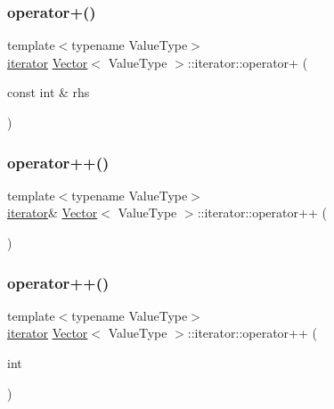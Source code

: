 \mbox{\label{classVector_1_1iterator_a92a558bb60ce7d4100520587da3043a7}} 
\subsubsection{\texorpdfstring{operator+()}{operator+()}}
{\footnotesize\ttfamily template$<$typename Value\+Type$>$ \\
\mbox{\hyperlink{classVector_1_1iterator}{iterator}} \mbox{\hyperlink{classVector}{Vector}}$<$ Value\+Type $>$\+::iterator\+::operator+ (\begin{DoxyParamCaption}\item[{const int \&}]{rhs }\end{DoxyParamCaption})\hspace{0.3cm}{\ttfamily [inline]}}

\mbox{\label{classVector_1_1iterator_aee1af72fa48042a12cdecdef98cb872c}} 
\subsubsection{\texorpdfstring{operator++()}{operator++()}\hspace{0.1cm}{\footnotesize\ttfamily [1/2]}}
{\footnotesize\ttfamily template$<$typename Value\+Type$>$ \\
\mbox{\hyperlink{classVector_1_1iterator}{iterator}}\& \mbox{\hyperlink{classVector}{Vector}}$<$ Value\+Type $>$\+::iterator\+::operator++ (\begin{DoxyParamCaption}{ }\end{DoxyParamCaption})\hspace{0.3cm}{\ttfamily [inline]}}

\mbox{\label{classVector_1_1iterator_a436b3205d0992af68d6894d2b0fc5554}} 
\subsubsection{\texorpdfstring{operator++()}{operator++()}\hspace{0.1cm}{\footnotesize\ttfamily [2/2]}}
{\footnotesize\ttfamily template$<$typename Value\+Type$>$ \\
\mbox{\hyperlink{classVector_1_1iterator}{iterator}} \mbox{\hyperlink{classVector}{Vector}}$<$ Value\+Type $>$\+::iterator\+::operator++ (\begin{DoxyParamCaption}\item[{int}]{ }\end{DoxyParamCaption})\hspace{0.3cm}{\ttfamily [inline]}}

